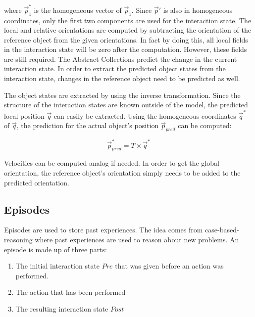 where $\vec{p}_1^*$ is the homogeneous vector of $\vec{p}_1$. Since $\vec{p}'$ is also in homogeneous coordinates, only the first two components are used for the interaction state. The local and relative orientations are computed by subtracting the orientation of the reference object from the given orientations. In fact by doing this, all local fields in the interaction state will be zero after the computation. However, these fields are still required. The Abstract Collections predict the change in the current interaction state. In order to extract the predicted object states from the interaction state, changes in the reference object need to be predicted as well. 

The object states are extracted by using the inverse transformation. Since the structure of the interaction states are known outside of the model, the predicted local position $\vec{q}$ can easily be extracted. Using the homogeneous coordinates $\vec{q}^*$ of $\vec{q}$, the prediction for the actual object's position $\vec{p}_{pred}$ can be computed:

\begin{equation}
\vec{p}_{pred}^* = T \times \vec{q}^*
\end{equation}

Velocities can be computed analog if needed.
In order to get the global orientation, the reference object's orientation simply needs to be added to the predicted orientation. 

\subsection{Episodes \label{sec:episodes}}

Episodes are used to store past experiences. The idea comes from case-based-reasoning \cite{cbr} where past experiences are used to reason about new problems. An episode is made up of three parts: 
\begin{enumerate}
\item The initial interaction state $Pre$ that was given before an action was performed.
\item The action that has been performed
\item The resulting interaction state $Post$ 
\end{enumerate}

